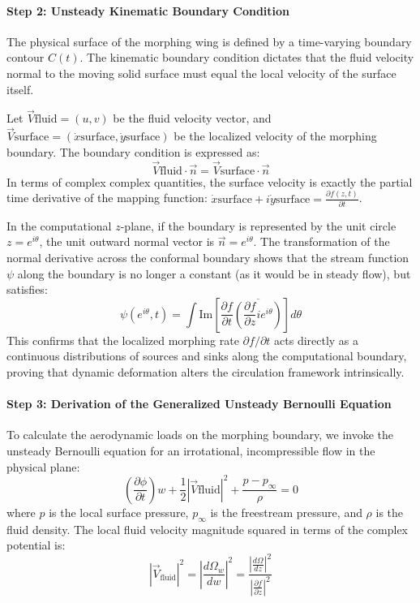 \documentclass[12pt,a4paper]{article}
\begin{document}
\paragraph{Step 2: Unsteady Kinematic Boundary Condition}
The physical surface of the morphing wing is defined by a time-varying boundary contour $C(t)$. The kinematic boundary condition dictates that the fluid velocity normal to the moving solid surface must equal the local velocity of the surface itself. 

Let $\vec{V}{\text{fluid}} = (u, v)$ be the fluid velocity vector, and $\vec{V}{\text{surface}} = (\dot{x}{\text{surface}}, \dot{y}{\text{surface}})$ be the localized velocity of the morphing boundary. The boundary condition is expressed as:
\begin{equation}
    \vec{V}{\text{fluid}} \cdot \vec{n} = \vec{V}{\text{surface}} \cdot \vec{n}
\end{equation}
In terms of complex complex quantities, the surface velocity is exactly the partial time derivative of the mapping function: $\dot{x}{\text{surface}} + i\dot{y}{\text{surface}} = \frac{\partial f(z,t)}{\partial t}$. 

In the computational $z$-plane, if the boundary is represented by the unit circle $z = e^{i\theta}$, the unit outward normal vector is $\vec{n} = e^{i\theta}$. The transformation of the normal derivative across the conformal boundary shows that the stream function $\psi$ along the boundary is no longer a constant (as it would be in steady flow), but satisfies:
\begin{equation}
    \psi(e^{i\theta}, t) = \int \text{Im} \left[ \frac{\partial f}{\partial t} \overline{\left( \frac{\partial f}{\partial z} i e^{i\theta} \right)} \right] d\theta
\end{equation}
This confirms that the localized morphing rate $\partial f/\partial t$ acts directly as a continuous distributions of sources and sinks along the computational boundary, proving that dynamic deformation alters the circulation framework intrinsically.

\paragraph{Step 3: Derivation of the Generalized Unsteady Bernoulli Equation}
To calculate the aerodynamic loads on the morphing boundary, we invoke the unsteady Bernoulli equation for an irrotational, incompressible flow in the physical plane:
\begin{equation}
    \left( \frac{\partial \phi}{\partial t} \right)w + \frac{1}{2} |\vec{V}{\text{fluid}}|^2 + \frac{p - p_\infty}{\rho} = 0
\end{equation}
where $p$ is the local surface pressure, $p_\infty$ is the freestream pressure, and $\rho$ is the fluid density. The local fluid velocity magnitude squared in terms of the complex potential is:
\begin{equation}
    |\vec{V}_{\text{fluid}}|^2 = \left| \frac{d\Omega_w}{dw} \right|^2 = \frac{\left| \frac{d\Omega}{dz} \right|^2}{\left| \frac{\partial f}{\partial z} \right|^2}
\end{equation}
\end{document}
